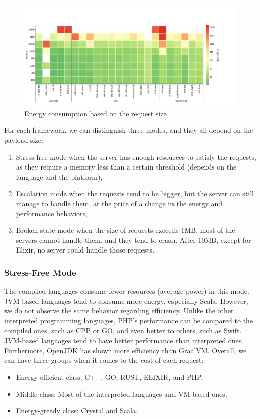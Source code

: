 \begin{figure}[!hbt]
    \begin{center}
        \includegraphics[width=1.2\linewidth]{imgs/energy_cost_payload}
    \end{center}
    \caption{Energy consumption based on the request size}\label{fig:energy_cost_payload}
\end{figure}

For each framework, we can distinguish three modes, and they all depend on the payload size:
\begin{enumerate}
    \item \textsf{Stress-free} mode when the server has enough resources to satisfy the requests, as they require a memory less than a certain threshold (depends on the language and the platform),
    \item \textsf{Escalation} mode when the requests tend to be bigger, but the server can still manage to handle them, at the price of a change in the energy and performance behaviors,
    \item \textsf{Broken state} mode when the size of requests exceeds 1MB, most of the servers cannot handle them, and they tend to crash. After 10MB, except for Elixir, no server could handle those requests.
\end{enumerate}


\subsubsection{Stress-Free Mode}
The compiled languages consume fewer resources (average power) in this mode.
JVM-based languages tend to consume more energy, especially Scala.
However, we do not observe the same behavior regarding efficiency.
Unlike the other interpreted programming languages, PHP's performance can be compared to the compiled ones, such as CPP or GO, and even better to others, such as Swift.
JVM-based languages tend to have better performance than interpreted ones.
Furthermore, OpenJDK has shown more efficiency than GraalVM.
Overall, we can have three groups when it comes to the cost of each request:
\begin{itemize}
    \item Energy-efficient class: C++, GO, RUST, ELIXIR, and PHP,
    \item Middle class: Most of the interpreted languages and VM-based ones,
    \item Energy-greedy class: Crystal and Scala.
\end{itemize}

